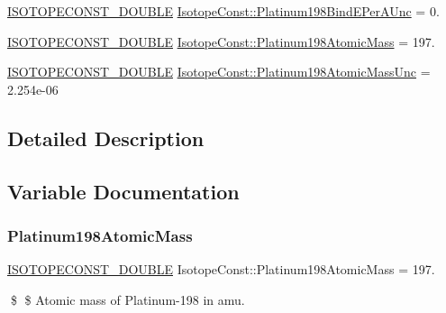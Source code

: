 \begin{DoxyCompactItemize}
\mbox{\hyperlink{group___isotope_const-_macros_ga8f45a7272ce02c0b4c65c44636ed719a}{I\+S\+O\+T\+O\+P\+E\+C\+O\+N\+S\+T\+\_\+\+D\+O\+U\+B\+LE}} \mbox{\hyperlink{group___isotope_const-_platinum-_pt198_ga8050292944f5bc889a7f511fd97bee25}{Isotope\+Const\+::\+Platinum198\+Bind\+E\+Per\+A\+Unc}} = 0.
\item 
\mbox{\hyperlink{group___isotope_const-_macros_ga8f45a7272ce02c0b4c65c44636ed719a}{I\+S\+O\+T\+O\+P\+E\+C\+O\+N\+S\+T\+\_\+\+D\+O\+U\+B\+LE}} \mbox{\hyperlink{group___isotope_const-_platinum-_pt198_ga3196288baac48583eae63f9f62ecd5ef}{Isotope\+Const\+::\+Platinum198\+Atomic\+Mass}} = 197.
\item 
\mbox{\hyperlink{group___isotope_const-_macros_ga8f45a7272ce02c0b4c65c44636ed719a}{I\+S\+O\+T\+O\+P\+E\+C\+O\+N\+S\+T\+\_\+\+D\+O\+U\+B\+LE}} \mbox{\hyperlink{group___isotope_const-_platinum-_pt198_gab2c8b84001d32608ce772e3c3b1a5882}{Isotope\+Const\+::\+Platinum198\+Atomic\+Mass\+Unc}} = 2.\+254e-\/06
\end{DoxyCompactItemize}


\subsection{Detailed Description}


\subsection{Variable Documentation}
\mbox{\label{group___isotope_const-_platinum-_pt198_ga3196288baac48583eae63f9f62ecd5ef}} 
\subsubsection{\texorpdfstring{Platinum198\+Atomic\+Mass}{Platinum198AtomicMass}}
{\footnotesize\ttfamily \mbox{\hyperlink{group___isotope_const-_macros_ga8f45a7272ce02c0b4c65c44636ed719a}{I\+S\+O\+T\+O\+P\+E\+C\+O\+N\+S\+T\+\_\+\+D\+O\+U\+B\+LE}} Isotope\+Const\+::\+Platinum198\+Atomic\+Mass = 197.}

\$ \$ Atomic mass of Platinum-\/198 in amu. \mbox{\label{group___isotope_const-_platinum-_pt198_gab2c8b84001d32608ce772e3c3b1a5882}} 
